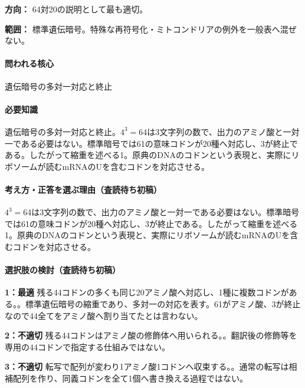 \noindent\textbf{方向：} 64対20の説明として最も適切。\par

\noindent\textbf{範囲：} 標準遺伝暗号。特殊な再符号化・ミトコンドリアの例外を一般表へ混ぜない。\par

\paragraph{問われる核心} 遺伝暗号の多対一対応と終止

\paragraph{必要知識} 遺伝暗号の多対一対応と終止。\(4^3=64\)は3文字列の数で、出力のアミノ酸と一対一である必要はない。標準暗号では61の意味コドンが20種へ対応し、3が終止である。したがって縮重を述べる1。原典のDNAのコドンという表現と、実際にリボソームが読むmRNAのUを含むコドンを対応させる。

\paragraph{考え方・正答を選ぶ理由（査読待ち初稿）} \(4^3=64\)は3文字列の数で、出力のアミノ酸と一対一である必要はない。標準暗号では61の意味コドンが20種へ対応し、3が終止である。したがって縮重を述べる1。原典のDNAのコドンという表現と、実際にリボソームが読むmRNAのUを含むコドンを対応させる。

\paragraph{選択肢の検討（査読待ち初稿）}\mbox{}\par

\noindent\textbf{1：最適} 残る44コドンの多くも同じ20アミノ酸へ対応し、1種に複数コドンがある。。標準遺伝暗号の縮重であり、多対一の対応を表す。61がアミノ酸、3が終止なので44全てをアミノ酸へ割り当てたとは言わない。\par

\noindent\textbf{2：不適切} 残る44コドンはアミノ酸の修飾体へ用いられる。。翻訳後の修飾等を専用の44コドンで指定する仕組みではない。\par

\noindent\textbf{3：不適切} 転写で配列が変わり1アミノ酸1コドンへ収束する。。通常の転写は相補配列を作り、同義コドンを全て1個へ書き換える過程ではない。\par

